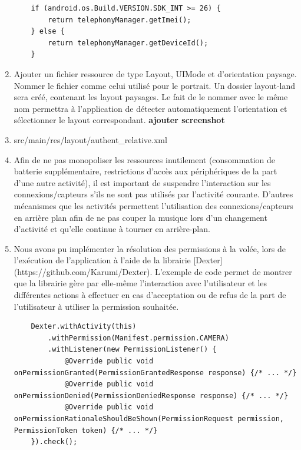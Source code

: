 \documentclass[a4paper]{article}
\begin{document}
\begin{enumerate}
    \begin{lstlisting}
    if (android.os.Build.VERSION.SDK_INT >= 26) {
        return telephonyManager.getImei();
    } else {
        return telephonyManager.getDeviceId();
    }
    \end{lstlisting}
    
    \item Ajouter un fichier ressource de type Layout, UIMode et d'orientation paysage. Nommer le fichier comme celui utilisé pour le portrait. Un dossier layout-land sera créé, contenant les layout paysages. Le fait de le nommer avec le même nom permettra à l'application de détecter automatiquement l'orientation et sélectionner le layout correspondant. \textbf{ajouter screenshot}
    
    \item src/main/res/layout/authent\_relative.xml
    
    \item Afin de ne pas monopoliser les ressources inutilement (consommation de batterie supplémentaire, restrictions d'accès aux périphériques de la part d'une autre activité), il est important de suspendre l'interaction sur les connexions/capteurs s'ils ne sont pas utilisés par l'activité courante. D'autres mécanismes que les activités permettent l'utilisation des connexions/capteurs en arrière plan afin de ne pas couper la musique lors d'un changement d'activité et qu'elle continue à tourner en arrière-plan.
    
    \item Nous avons pu implémenter la résolution des permissions à la volée, lors de l'exécution de l'application à l'aide de la librairie [Dexter](https://github.com/Karumi/Dexter). L'exemple de code permet de montrer que la librairie gère par elle-même l'interaction avec l'utilisateur et les différentes actions à effectuer en cas d'acceptation ou de refus de la part de l'utilisateur à utiliser la permission souhaitée.
    
    \begin{lstlisting}
    Dexter.withActivity(this)
        .withPermission(Manifest.permission.CAMERA)
        .withListener(new PermissionListener() {
            @Override public void onPermissionGranted(PermissionGrantedResponse response) {/* ... */}
            @Override public void onPermissionDenied(PermissionDeniedResponse response) {/* ... */}
            @Override public void onPermissionRationaleShouldBeShown(PermissionRequest permission, PermissionToken token) {/* ... */}
    }).check();
    \end{lstlisting}
    
    
\end{enumerate}
\end{document}
